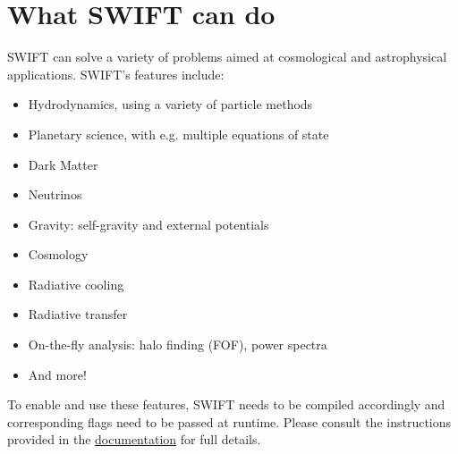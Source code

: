 \section{What SWIFT can do}

SWIFT can solve a variety of problems aimed at cosmological and
astrophysical applications. SWIFT's features include:

\begin{itemize}
\item Hydrodynamics, using a variety of particle methods
\item Planetary science, with e.g. multiple equations of state
\item Dark Matter
\item Neutrinos
\item Gravity: self-gravity and external potentials
\item Cosmology
\item Radiative cooling
\item Radiative transfer
\item On-the-fly analysis: halo finding (FOF), power spectra
\item And more!
\end{itemize}

To enable and use these features, SWIFT needs to be compiled accordingly
and corresponding flags need to be passed at runtime. Please consult the
instructions provided in the
\href{https://swift.strw.leidenuniv.nl/docs/}{documentation}
for full details.
